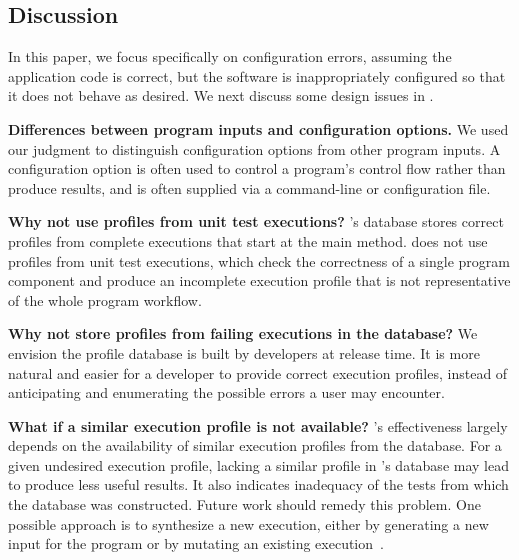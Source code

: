 \subsection{Discussion}

In this paper, we focus specifically on configuration errors,
assuming the application code is correct, but the software		
is inappropriately configured so that it does not		
behave as desired. We next discuss some design issues in \ourtool.

\vspace{1mm}
\noindent \textbf{Differences between program inputs and configuration options.}
We used our judgment to distinguish configuration options 
from other program inputs. A configuration option is
often used to control a program's control flow rather
than produce results, and is often supplied via a command-line
 or configuration file.



\vspace{1mm}
\noindent \textbf{Why not use profiles from unit test executions?}
\ourtool's database stores correct profiles from complete 
executions that start at the main method.
\ourtool does not use profiles from unit test executions, which check the
correctness
of a single program component and produce
an incomplete execution profile that is not representative of
the whole program workflow. 



\vspace{1mm}
\noindent \textbf{Why not store profiles from failing executions in the database?}
We envision the profile database is built by developers at release time.
It is more natural and easier for a developer to provide correct execution
profiles, instead of anticipating and enumerating the possible
errors a user may encounter.

\vspace{1mm}
\noindent \textbf{What if a similar execution profile is not available?}
\ourtool's effectiveness largely depends on the availability of
similar execution profiles from the database. For a given undesired execution profile, lacking a similar
profile in \ourtool's database may lead \ourtool to produce
less useful results.  It also indicates inadequacy of the tests from
which the database was constructed.
Future work should remedy this problem. One
possible approach is to synthesize a new execution, either by
generating a new input for the program or by mutating an
existing execution~\cite{sumnerICSE2011}.


